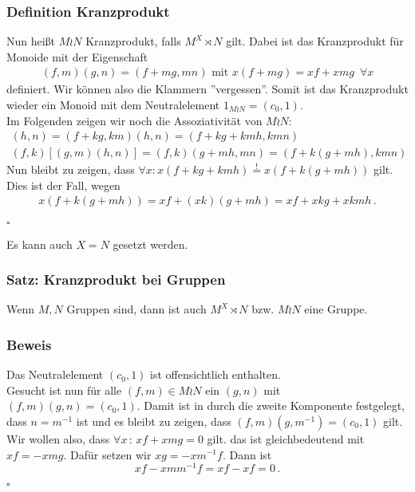 \documentclass[12pt, german]{article}
\newcommand{\bewiesen}{
	
	\begin{flushright}
		$\square$  \\
\end{flushright}}
\begin{document}
	\subsubsection{Definition Kranzprodukt}
	Nun hei\ss t $M \wr N$ Kranzprodukt, falls $M^X \rtimes N$ gilt. Dabei ist das Kranzprodukt für Monoide mit der Eigenschaft
	\begin{align*}
		(f,m)(g,n) = (f + mg, mn) \text{ mit } x(f+mg) = xf + xmg \, \, \, \forall x
	\end{align*}
	definiert.
	Wir können also die Klammern ''vergessen''. Somit ist das Kranzprodukt wieder ein Monoid mit dem Neutralelement $1_{M \wr N}= (c_0,1)$.
	\\
	Im Folgenden zeigen wir noch die Assoziativität von $M \wr N$:
	\begin{align*}
		[(f,k)(g,m)](h,n) = (f +kg, km)(h,n) = (f +kg + kmh, kmn) \\
		(f,k)[(g,m)(h,n)] = (f,k)(g +mh, mn) = (f + k ( g +mh),kmn) 
	\end{align*}
	Nun bleibt zu zeigen, dass $\forall x : x(f+kg + kmh) \overset{!}{=} x(f+k(g+mh))$ gilt. \\
	Dies ist der Fall, wegen 
	\begin{align*}
		x(f+k(g+mh)) = xf+(xk)(g + mh) = xf + xkg + xkmh\, .
	\end{align*}
	\bewiesen
	Es kann auch $X=N$ gesetzt werden.
	
	\subsubsection{Satz: Kranzprodukt bei Gruppen}
	Wenn $M, N$ Gruppen sind, dann ist auch $M^X \rtimes N$ bzw. $M \wr N$ eine Gruppe. 
	
	\subsubsection{Beweis}
	Das Neutralelement $(c_0, 1)$ ist offensichtlich enthalten.\\
	Gesucht ist nun für alle $(f, m) \in M \wr N$ ein $(g,n)$ mit $(f, m)(g,n) = (c_0, 1)$.
	Damit ist in durch die zweite Komponente festgelegt, dass $n=m^{-1}$ ist und es bleibt zu zeigen, dass $(f,m)(g, m^{-1}) = (c_0,1)$  gilt. \\
	Wir wollen also, dass $\forall x \, : \,xf+xmg=0$ gilt. das ist gleichbedeutend mit $xf=-xmg$.
	Dafür setzen wir $xg = -xm^{-1}f$. Dann ist $$xf-xmm^{-1}f = xf-xf = 0\, .$$	\bewiesen
	
\end{document}
